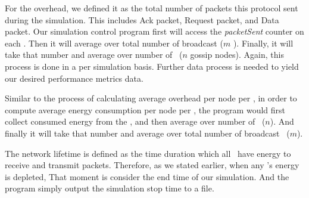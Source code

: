For the overhead, we defined it as the total number of packets this protocol sent during the simulation. This includes Ack packet, Request packet, and Data packet. Our simulation control program first will access the \emph{packetSent} counter on each \gn. Then it will average over total number of broadcast \msgs ($m$ \msgs). Finally, it will take that number and average over number of \gns ~($n$ gossip nodes). Again, this process is done in a per simulation basis. Further data process is needed to yield our desired performance metrics data.

Similar to the process of calculating average overhead per node per \msg, in order to compute average energy consumption per node per \msg, the program would first collect consumed energy from the \gns, and then average over number of \gns ~($n$). And finally it will take that number and average over total number of broadcast \msgs ~($m$). 

The network lifetime is defined as the time duration which all \gns ~have energy to receive and transmit packets. Therefore, as we stated earlier, when any \gn's energy is depleted, That moment is consider the end time of our simulation. And the program simply output the simulation stop time to a file.
